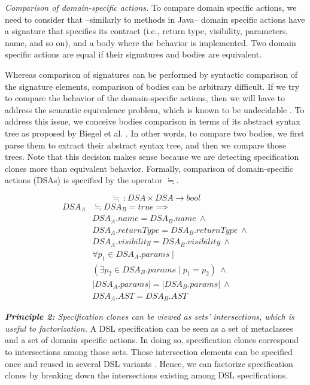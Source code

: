 \emph{Comparison of domain-specific actions.} To compare domain specific actions, we need to consider that --similarly to methods in Java-- domain specific actions have a signature that specifies its contract (i.e., return type, visibility, parameters, name, and so on), and a body where the behavior is implemented. Two domain specific actions are equal if their signatures and bodies are equivalent.

Whereas comparison of signatures can be performed by syntactic comparison of the signature elements, comparison of bodies can be arbitrary difficult. If we try to compare the behavior of the domain-specific actions, then we will have to address the semantic equivalence problem, which is known to be undecidable \cite{Lucanu:2013}. To address this issue, we conceive bodies comparison in terms of its abstract syntax tree as proposed by Biegel et al. \cite{Biegel:2010}. In other words, to compare two bodies, we first parse them to extract their abstract syntax tree, and then we compare those trees. Note that this decision makes sense because we are detecting specification clones more than equivalent behavior. Formally, comparison of domain-specific actions (DSAs) is specified by the operator $\fallingdotseq$.  

\begin{equation}
  \fallingdotseq~: DSA \times DSA \rightarrow bool
\end{equation}
\begin{equation}
\begin{split}
  DSA_{A} & \fallingdotseq DSA_{B} = true \implies \\
   & DSA_{A}.name = DSA_{B}.name ~ \wedge \\
   & DSA_{A}.returnType = DSA_{B}.returnType ~ \wedge \\
   & DSA_{A}.visibility = DSA_{B}.visibility ~ \wedge \\
   & \forall p_1 \in DSA_{A}.params \mid \\
   & (\exists p_2 \in DSA_{B}.params \mid p_1 = p_2)  ~ \wedge \\
   & |DSA_{A}.params| = |DSA_{B}.params|  ~ \wedge \\
   & DSA_{A}.AST = DSA_{B}.AST
 \end{split}
\end{equation}

\vspace{2mm}
\emph{\textbf{Principle 2:} Specification clones can be viewed as sets' intersections, which is useful to factorization.} A DSL specification can be seen as a set of metaclasses and a set of domain specific actions. In doing so, specification clones correspond to intersections among those sets. Those intersection elements can be specified once and reused in several DSL variants \cite[p. 60-61]{Voelter:2013b}. Hence, we can factorize specification clones by breaking down the intersections existing among DSL specifications.

